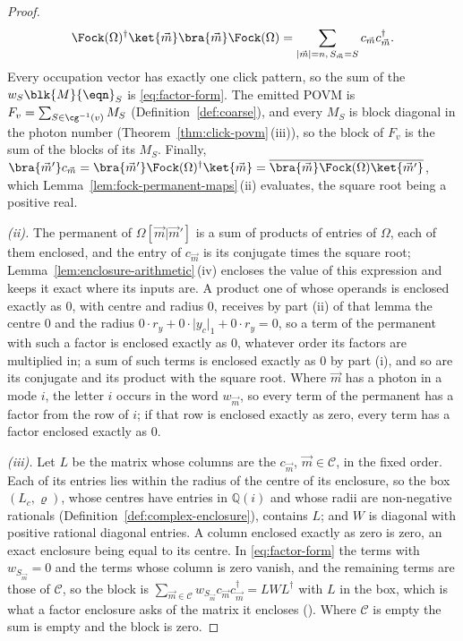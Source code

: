 \begin{proof}
\begin{equation*}
  \Fock(\Omega)^{\dagger}\ket{\vec m}\bra{\vec m}\Fock(\Omega)
  =\sum_{|\vec m|=n,\,S_{\vec m}=S}c_{\vec m}c_{\vec m}^{\dagger}.
\end{equation*}
Every occupation vector has exactly one click pattern, so the sum of the
$w_S\blk{M}{\eqn}_S$ is \eqref{eq:factor-form}. The emitted POVM is
$F_v=\sum_{S\in\cg^{-1}(v)}M_S$ (Definition~\ref{def:coarse}), and every $M_S$
is block diagonal in the photon number (Theorem~\ref{thm:click-povm}\,(iii)),
so the block of $F_v$ is the sum of the blocks of its $M_S$. Finally,
$\bra{\vec m'}c_{\vec m}=\bra{\vec m'}\Fock(\Omega)^{\dagger}\ket{\vec m}
=\overline{\bra{\vec m}\Fock(\Omega)\ket{\vec m'}}$, which
Lemma~\ref{lem:fock-permanent-maps}\,(ii) evaluates, the square root being a
positive real.

\emph{(ii).} The permanent of $\Omega[\vec m|\vec m']$ is a sum of products of
entries of $\Omega$, each of them enclosed, and the entry of $c_{\vec m}$ is
its conjugate times the square root; Lemma~\ref{lem:enclosure-arithmetic}\,(iv)
encloses the value of this expression and keeps it exact where its inputs
are. A product one of whose operands is enclosed exactly as $0$, with centre
and radius $0$, receives by part (ii) of that lemma the centre $0$ and the
radius $0\cdot r_y+0\cdot\lvert y_c\rvert_{1}+0\cdot r_y=0$, so a term of the
permanent with such a factor is enclosed exactly as $0$, whatever order its
factors are multiplied in; a sum of such terms is enclosed exactly as $0$ by
part (i), and so are its conjugate and its product with the square root.
Where $\vec m$ has a photon in a mode $i$, the letter $i$ occurs in the word
$w_{\vec m}$, so every term of the permanent has a factor from the row of
$i$; if that row is enclosed exactly as zero, every term has a factor
enclosed exactly as $0$.

\emph{(iii).} Let $L$ be the matrix whose columns are the $c_{\vec m}$,
$\vec m\in\mathcal{C}$, in the fixed order. Each of its entries lies within
the radius of the centre of its enclosure, so the box $(L_c,\varrho)$, whose
centres have entries in $\mathbb{Q}(i)$ and whose radii are non-negative
rationals (Definition~\ref{def:complex-enclosure}), contains $L$; and $W$ is
diagonal with positive rational diagonal entries. A column enclosed exactly
as zero is zero, an exact enclosure being equal to its centre. In
\eqref{eq:factor-form} the terms with $w_{S_{\vec m}}=0$ and the terms whose
column is zero vanish, and the remaining terms are those of $\mathcal{C}$, so
the block is
$\sum_{\vec m\in\mathcal{C}}w_{S_{\vec m}}c_{\vec m}c_{\vec m}^{\dagger}=LWL^{\dagger}$
with $L$ in the box, which is what a factor enclosure asks of the matrix it
encloses (). Where $\mathcal{C}$ is
empty the sum is empty and the block is zero.


\end{proof}
